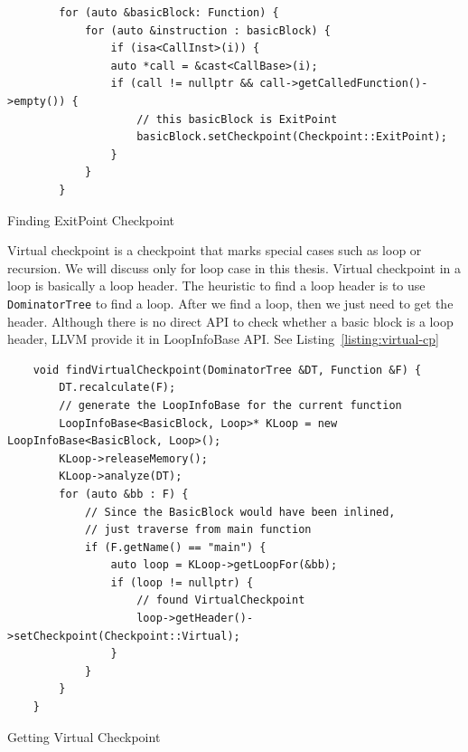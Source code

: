 \begin{listing}[htbp]
    \begin{verbatim}
        for (auto &basicBlock: Function) {
            for (auto &instruction : basicBlock) {
                if (isa<CallInst>(i)) {
                auto *call = &cast<CallBase>(i);
                if (call != nullptr && call->getCalledFunction()->empty()) {
                    // this basicBlock is ExitPoint
                    basicBlock.setCheckpoint(Checkpoint::ExitPoint);
                } 
            }
        } 
    \end{verbatim}
    \caption{Finding ExitPoint Checkpoint}    
    \label{listing:exit-point-cp}
\end{listing}

Virtual checkpoint is a checkpoint that marks special cases such as loop or
recursion. We will discuss only for loop case in this thesis. Virtual checkpoint
in a loop is basically a loop header. The heuristic to find a loop header is to
use \texttt{DominatorTree} to find a loop. After we find a loop, then we just
need to get the header. Although there is no direct API to check whether a basic
block is a loop header, LLVM provide it in LoopInfoBase API. See
Listing~\ref{listing:virtual-cp}

\begin{listing}[htbp]
    \begin{verbatim}
    void findVirtualCheckpoint(DominatorTree &DT, Function &F) {
        DT.recalculate(F);
        // generate the LoopInfoBase for the current function
        LoopInfoBase<BasicBlock, Loop>* KLoop = new LoopInfoBase<BasicBlock, Loop>();
        KLoop->releaseMemory();
        KLoop->analyze(DT);
        for (auto &bb : F) {
            // Since the BasicBlock would have been inlined, 
            // just traverse from main function
            if (F.getName() == "main") {
                auto loop = KLoop->getLoopFor(&bb);
                if (loop != nullptr) {
                    // found VirtualCheckpoint
                    loop->getHeader()->setCheckpoint(Checkpoint::Virtual);
                }
            }
        }
    }
    \end{verbatim}
    \caption{Getting Virtual Checkpoint}
    \label{listing:virtual-cp}
\end{listing}



